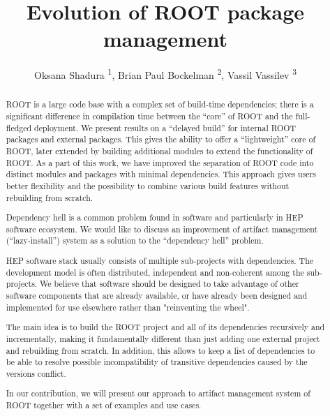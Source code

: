 \documentclass[12pt]{iopart}
\begin{document}
\title{Evolution of ROOT package management}

\author{Oksana Shadura \textsuperscript{1},  Brian Paul Bockelman  \textsuperscript{2},  Vassil Vassilev \textsuperscript{3}}
\address{ \textsuperscript{1} University of Nebraska-Lincoln, USA \\
\textsuperscript{2} Morgridge Institute for Research, USA \\
\textsuperscript{3} Princeton University, USA}
\vspace{10pt}

\begin{abstract}
ROOT is a large code base with a complex set of build-time dependencies; there is a significant difference in compilation time between the “core” of ROOT and the full-fledged deployment. We present results on a “delayed build” for internal ROOT packages and external packages. This gives the ability to offer a “lightweight” core of ROOT, later extended by building additional modules to extend the functionality of ROOT. As a part of this work, we have improved the separation of ROOT code into distinct modules and packages with minimal dependencies. This approach gives users better flexibility and the possibility to combine various build features without rebuilding from scratch.

Dependency hell is a common problem found in software and particularly in HEP software ecosystem. We would like to discuss an improvement of artifact management (“lazy-install”) system as a solution to the “dependency hell” problem.

HEP software stack usually consists of multiple sub-projects with dependencies. The development model is often distributed, independent and non-coherent among the sub-projects. We believe that software should be designed to take advantage of other software components that are already available, or have already been designed and implemented for use elsewhere rather than "reinventing the wheel". 

The main idea is to build the ROOT project and all of its dependencies recursively and incrementally, making it fundamentally different than just adding one external project and rebuilding from scratch. In addition, this allows to keep a list of dependencies to be able to resolve possible incompatibility of transitive dependencies caused by the versions conflict.

In our contribution, we will present our approach to artifact management system of ROOT together with a set of examples and use cases.
\end{abstract}
\end{document}
